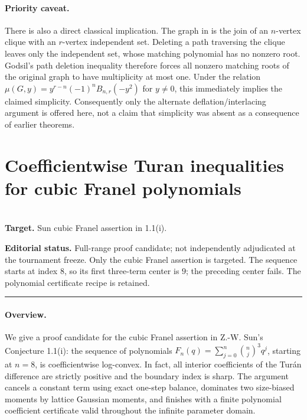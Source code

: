 \documentclass[11pt,a4paper]{article}
\begin{document}
\paragraph{Priority caveat.}
There is also a direct classical implication. The graph in \cite[Thm.~3.2]{R18R:AN}
is the join of an $n$-vertex clique with an $r$-vertex independent set.
Deleting a path traversing the clique leaves only the independent set,
whose matching polynomial has no nonzero root. Godsil's path deletion
inequality \cite{R18R:Godsil} therefore forces all nonzero matching roots of the
original graph to have multiplicity at most one. Under the relation
$\mu(G,y)=y^{r-n}(-1)^n B_{n,r}(-y^2)$ for $y\ne0$, this immediately implies
the claimed simplicity. Consequently only the alternate deflation/interlacing
argument is offered here, not a claim that simplicity was absent as a consequence
of earlier theorems.
\endgroup


\clearpage

\section{Coefficientwise Turan inequalities for cubic Franel polynomials}
\label{section:R19M}
\\[3pt]
\noindent\textbf{Target.} Sun cubic Franel assertion in 1.1(i).

\noindent\textbf{Editorial status.} Full-range proof candidate; not independently adjudicated at the tournament freeze. Only the cubic Franel assertion is targeted. The sequence starts at index $8$, so its first three-term center is $9$; the preceding center fails. The polynomial certificate recipe is retained.

\smallskip\hrule\medskip



\begingroup
\newcommand{\supp}{\operatorname{supp}}
\setcounter{equation}{0}
\renewcommand{\theequation}{\thesection.\arabic{equation}}
\renewcommand{\theHequation}{R19M.\arabic{equation}}
\paragraph{Overview.}
We give a proof candidate for the cubic Franel assertion in Z.-W. Sun's
Conjecture 1.1(i): the sequence of polynomials
$F_n(q)=\sum_{j=0}^n\binom nj^3q^j$, starting at $n=8$, is
coefficientwise log-convex. In fact, all interior coefficients of the
Tur\'an difference are strictly positive and the boundary index is sharp.
The argument cancels a constant term using exact one-step balance,
dominates two size-biased moments by lattice Gaussian moments,
and finishes with a finite polynomial coefficient certificate
valid throughout the infinite parameter domain.
\end{document}
